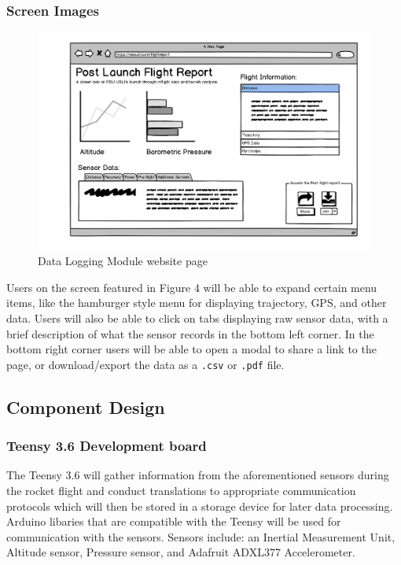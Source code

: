 \documentclass[onecolumn, draftclsnofoot,10pt, compsoc]{IEEEtran}
\def\code#1{\texttt{#1}}
\begin{document}
\subsubsection{Screen Images}
\begin{figure}[h]
	\begin{center}
		\caption{Data Logging Module website page}
		\includegraphics[width=\textwidth]{DLMGroundStationWireframe}
	\end{center}
\end{figure}
Users on the screen featured in Figure 4 will be able to expand certain menu items, like the hamburger style menu for displaying trajectory, GPS, and other data. Users will also be able to click on tabs displaying raw sensor data, with a brief description of what the sensor records in the bottom left corner. In the bottom right corner users will be able to open a modal to share a link to the page, or download/export the data as a \code{.csv} or \code{.pdf} file.

\subsection{Component Design}
\subsubsection{Teensy 3.6 Development board}
The Teensy 3.6 will gather information from the aforementioned sensors during the rocket flight and conduct translations to appropriate communication protocols which will then be stored in a storage device for later data processing. Arduino libaries that are compatible with the Teensy will be used for communication with the sensors. Sensors include: an Inertial Measurement Unit, Altitude sensor, Pressure sensor, and Adafruit ADXL377 Accelerometer.
\end{document}
